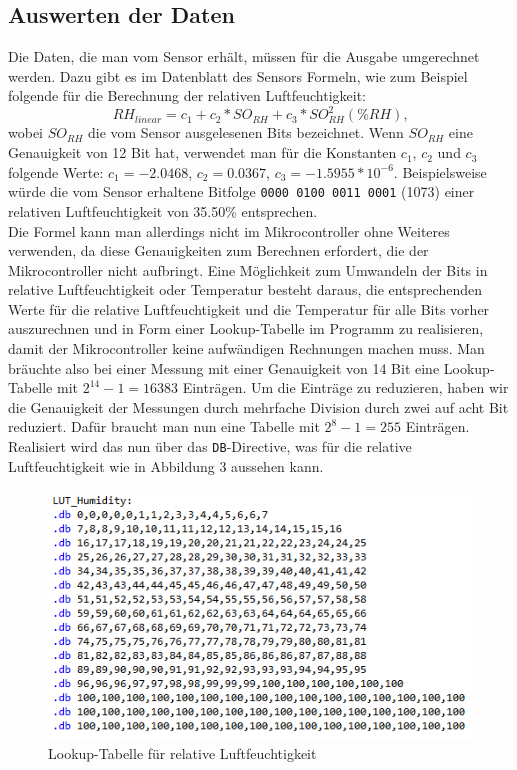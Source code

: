 \documentclass[]{article}
\begin{document}
\subsection{Auswerten der Daten}
Die Daten, die man vom Sensor erhält, müssen für die Ausgabe umgerechnet werden. Dazu gibt es im Datenblatt des Sensors Formeln, wie zum Beispiel folgende für die Berechnung der relativen Luftfeuchtigkeit:
\begin{equation*}
RH_{linear} = c_1 + c_2*SO_{RH} + c_3*SO_{RH}^{2} \left(\%RH\right)\textbf{,}
\end{equation*}
wobei $SO_{RH}$ die vom Sensor ausgelesenen Bits bezeichnet. Wenn $SO_{RH}$ eine Genauigkeit von 12 Bit hat, verwendet man für die Konstanten $c_1$, $c_2$ und $c_3$ folgende Werte: $c_1 = -2.0468$, $c_2 = 0.0367$, $c_3 = -1.5955*10^{-6}$.
Beispielsweise würde die vom Sensor erhaltene Bitfolge \texttt{0000 0100 0011 0001} (1073) einer relativen Luftfeuchtigkeit von 35.50\% entsprechen.\\
Die Formel kann man allerdings nicht im Mikrocontroller ohne Weiteres verwenden, da diese Genauigkeiten zum Berechnen erfordert, die der Mikrocontroller nicht aufbringt. Eine Möglichkeit zum Umwandeln der Bits in relative Luftfeuchtigkeit oder Temperatur besteht daraus, die entsprechenden Werte für die relative Luftfeuchtigkeit und die Temperatur für alle Bits vorher auszurechnen und in Form einer Lookup-Tabelle im Programm zu realisieren, damit der Mikrocontroller keine aufwändigen Rechnungen machen muss. Man bräuchte also bei einer Messung mit einer Genauigkeit von 14 Bit eine Lookup-Tabelle mit $2^{14}-1 = 16383$ Einträgen. Um die Einträge zu reduzieren, haben wir die Genauigkeit der Messungen durch mehrfache Division durch zwei auf acht Bit reduziert. Dafür braucht man nun eine Tabelle mit $2^8-1 = 255$ Einträgen. Realisiert wird das nun über das \texttt{DB}-Directive, was für die relative Luftfeuchtigkeit wie in Abbildung 3 aussehen kann.
\begin{figure}[h]
	\centering
	\includegraphics[width=0.8\columnwidth]{LUT.png}
	\caption{Lookup-Tabelle für relative Luftfeuchtigkeit}
\end{figure}
\end{document}
